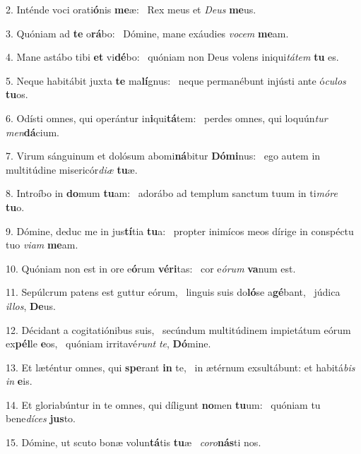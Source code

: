 2. Inténde voci orati\textbf{ó}nis \textbf{me}æ: \ast\  Rex meus et \textit{De}\textit{us} \textbf{me}us.\

3. Quóniam ad \textbf{te} o\textbf{rá}bo: \ast\  Dómine, mane exáudies \textit{vo}\textit{cem} \textbf{me}am.\

4. Mane astábo tibi \textbf{et} vi\textbf{dé}bo: \ast\  quóniam non Deus volens iniqui\textit{tá}\textit{tem} \textbf{tu} es.\

5. Neque habitábit juxta \textbf{te} ma\textbf{lí}gnus: \ast\  neque permanébunt injústi ante ó\textit{cu}\textit{los} \textbf{tu}os.\

6. Odísti omnes, qui operántur in\textbf{i}qui\textbf{tá}tem: \ast\  perdes omnes, qui loquún\textit{tur} \textit{men}\textbf{dá}cium.\

7. Virum sánguinum et dolósum abomi\textbf{ná}bitur \textbf{Dó}\textbf{mi}nus: \ast\  ego autem in multitúdine misericór\textit{di}\textit{æ} \textbf{tu}æ.\

8. Introíbo in \textbf{do}mum \textbf{tu}am: \ast\  adorábo ad templum sanctum tuum in ti\textit{mó}\textit{re} \textbf{tu}o.\

9. Dómine, deduc me in jus\textbf{tí}tia \textbf{tu}a: \ast\  propter inimícos meos dírige in conspéctu tuo \textit{vi}\textit{am} \textbf{me}am.\

10. Quóniam non est in ore e\textbf{ó}rum \textbf{vé}\textbf{ri}tas: \ast\  cor e\textit{ó}\textit{rum} \textbf{va}num est.\

11. Sepúlcrum patens est guttur eórum, \dag\  linguis suis do\textbf{ló}se a\textbf{gé}bant, \ast\  júdica \textit{il}\textit{los}, \textbf{De}us.\

12. Décidant a cogitatiónibus suis, \dag\  secúndum multitúdinem impietátum eórum ex\textbf{pél}le \textbf{e}os, \ast\  quóniam irritavé\textit{runt} \textit{te}, \textbf{Dó}mine.\

13. Et læténtur omnes, qui \textbf{spe}rant \textbf{in} te, \ast\  in ætérnum exsultábunt: et habitá\textit{bis} \textit{in} \textbf{e}is.\

14. Et gloriabúntur in te omnes, qui díligunt \textbf{no}men \textbf{tu}um: \ast\  quóniam tu bene\textit{dí}\textit{ces} \textbf{jus}to.\

15. Dómine, ut scuto bonæ volun\textbf{tá}tis \textbf{tu}æ \ast\  \textit{co}\textit{ro}\textbf{nás}ti nos.\

